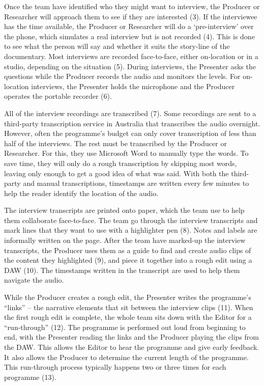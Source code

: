 Once the team have identified who they might want to interview, the Producer or Researcher will approach them to see if
they are interested (3).  If the interviewee has the time available, the Producer or Researcher will do a
`pre-interview' over the phone, which simulates a real interview but is not recorded (4). This is done to see what the
person will say and whether it suits the story-line of the documentary.  Most interviews are recorded face-to-face,
either on-location or in a studio, depending on the situation (5).  During interviews, the Presenter asks the questions
while the Producer records the audio and monitors the levels.  For on-location interviews, the Presenter holds the
microphone and the Producer operates the portable recorder (6).

All of the interview recordings are transcribed (7). Some recordings are sent to a third-party transcription service in
Australia that transcribes the audio overnight.  However, often the programme's budget can only cover transcription of
less than half of the interviews. The rest must be transcribed by the Producer or Researcher. For this, they use
Microsoft Word to manually type the words.  To save time, they will only do a rough transcription by skipping most
words, leaving only enough to get a good idea of what was said.  With both the third-party and manual transcriptions,
timestamps are written every few minutes to help the reader identify the location of the audio.

The interview transcripts are printed onto paper, which the team use to help them collaborate face-to-face.  The team
go through the interview transcripts and mark lines that they want to use with a highlighter pen (8). Notes and labels
are informally written on the page.  After the team have marked-up the interview transcripts, the Producer uses them as
a guide to find and create audio clips of the content they highlighted (9), and piece it together into a rough edit
using a DAW (10). The timestamps written in the transcript are used to help them navigate the audio.

While the Producer creates a rough edit, the Presenter writes the programme's ``links'' -- the narrative elements that
sit between the interview clips (11). When the first rough edit is complete, the whole team sits down with the Editor
for a ``run-through'' (12). The programme is performed out loud from beginning to end, with the Presenter reading the
links and the Producer playing the clips from the DAW. This allows the Editor to hear the programme and give early
feedback. It also allows the Producer to determine the current length of the programme.  This run-through process
typically happens two or three times for each programme (13).

